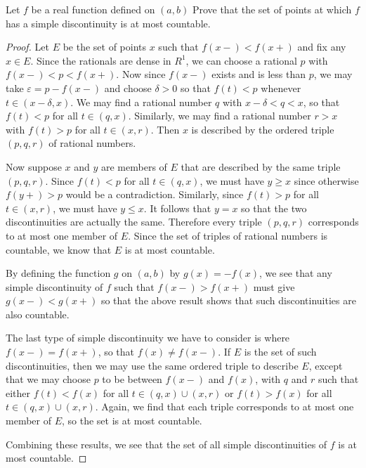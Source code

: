  Let $f$ be a real function defined on $(a,b)$ Prove that
the set of points at which $f$ has a simple discontinuity is at most
countable.
\begin{proof}
  Let $E$ be the set of points $x$ such that $f(x-) < f(x+)$ and fix
  any $x\in E$. Since the rationals are dense in $R^1$, we can choose
  a rational $p$ with $f(x-) < p < f(x+)$. Now since $f(x-)$ exists
  and is less than $p$, we may take $\varepsilon = p - f(x-)$ and
  choose $\delta > 0$ so that $f(t) < p$ whenever
  $t\in(x - \delta, x)$. We may find a rational number $q$ with
  $x - \delta < q < x$, so that $f(t) < p$ for all
  $t\in(q,x)$. Similarly, we may find a rational number $r > x$ with
  $f(t) > p$ for all $t\in(x,r)$. Then $x$ is described by the ordered
  triple $(p,q,r)$ of rational numbers.

  Now suppose $x$ and $y$ are members of $E$ that are described by the
  same triple $(p,q,r)$. Since $f(t) < p$ for all $t\in(q,x)$, we must
  have $y\geq x$ since otherwise $f(y+) > p$ would be a
  contradiction. Similarly, since $f(t) > p$ for all $t\in(x,r)$, we
  must have $y\leq x$. It follows that $y = x$ so that the two
  discontinuities are actually the same. Therefore every triple
  $(p,q,r)$ corresponds to at most one member of $E$. Since the set of
  triples of rational numbers is countable, we know that $E$ is at
  most countable.

  By defining the function $g$ on $(a,b)$ by $g(x) = -f(x)$, we see
  that any simple discontinuity of $f$ such that $f(x-) > f(x+)$ must
  give $g(x-) < g(x+)$ so that the above result shows that such
  discontinuities are also countable.

  The last type of simple discontinuity we have to consider is where
  $f(x-) = f(x+)$, so that $f(x)\neq f(x-)$. If $E$ is the set of such
  discontinuities, then we may use the same ordered triple to describe
  $E$, except that we may choose $p$ to be between $f(x-)$ and $f(x)$,
  with $q$ and $r$ such that either $f(t) < f(x)$ for all
  $t\in(q,x)\cup(x,r)$ or $f(t) > f(x)$ for all
  $t\in(q,x)\cup(x,r)$. Again, we find that each triple corresponds to
  at most one member of $E$, so the set is at most countable.

  Combining these results, we see that the set of all simple
  discontinuities of $f$ is at most countable.
\end{proof}

